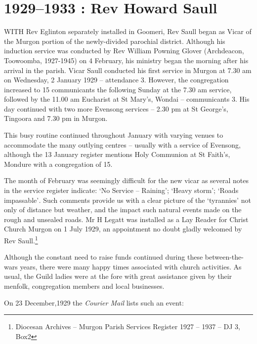\printendnotes[custom]
\setcounter{endnote}{0}
\chapter{1929--1933 : Rev Howard Saull}
\nobalance


\lettrine[lines=3]{W}{ITH}
 Rev Eglinton separately installed in Goomeri, Rev Saull began as Vicar of the Murgon portion of the newly-divided parochial district. Although his induction service was conducted by Rev William Powning Glover (Archdeacon, Toowoomba, 1927-1945) on 4 February, his ministry began the morning after his arrival in the parish. Vicar Saull conducted his first service in Murgon at 7.30 am on Wednesday, 2 January 1929 -- attendance 3. However, the congregation increased to 15 communicants the following Sunday at the 7.30 am service, followed by the 11.00 am Eucharist at St Mary's, Wondai -- communicants 3. His day continued with two more Evensong services -- 2.30 pm at St George's, Tingoora and 7.30 pm in Murgon.

This busy routine continued throughout January with varying venues to accommodate the many outlying centres -- usually with a service of Evensong, although the 13 January register mentions Holy Communion at St Faith's, Mondure with a congregation of 15.



The month of February was seemingly difficult for the new vicar as several notes in the service register indicate: `No Service -- Raining'; `Heavy storm'; `Roads impassable'\emph{.} Such comments provide us with a clear picture of the `tyrannies' not only of distance but weather, and the impact such natural events made on the rough and unsealed roads. Mr H Legatt was installed as a Lay Reader for Christ Church Murgon on 1 July 1929, an appointment no doubt gladly welcomed by Rev Saull.\footnote{Diocesan Archives -- Murgon Parish Services Register 1927 -- 1937 -- DJ 3, Box2}


Although the constant need to raise funds continued during these between-the-wars years, there were many happy times associated with church activities. As usual, the Guild ladies were at the fore with great assistance given by their menfolk, congregation members and local businesses.



On 23 December,1929 the \emph{Courier Mail} lists such an event:



